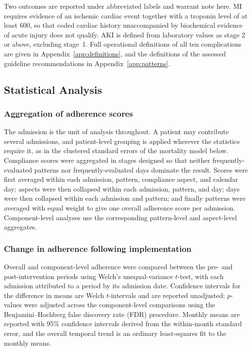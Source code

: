 Two outcomes are reported under abbreviated labels and warrant note here.
MI requires evidence of an ischemic
cardiac event together with a troponin level of at least 600, so that coded
cardiac history unaccompanied by biochemical evidence of acute injury does
not qualify. AKI is defined from laboratory
values as stage 2 or above, excluding stage~1. Full operational definitions
of all ten complications are given in Appendix~\ref{app:definitions}, and
the definitions of the assessed guideline recommendations in
Appendix~\ref{app:patterns}.

\subsection{Statistical Analysis}

\subsubsection{Aggregation of adherence scores}

The admission is the unit of analysis throughout. A patient may contribute
several admissions, and patient-level grouping is applied wherever the
statistics require it, as in the clustered standard errors of the mortality
model below. Compliance scores were aggregated in
stages designed so that neither frequently-evaluated patterns nor
frequently-evaluated days dominate the result. Scores were first averaged
within each admission, pattern, compliance aspect, and calendar day; aspects
were then collapsed within each admission, pattern, and day; days were then
collapsed within each admission and pattern; and finally patterns were
averaged with equal weight to give one overall adherence score per
admission. Component-level analyses use the corresponding pattern-level and
aspect-level aggregates.

\subsubsection{Change in adherence following implementation}

Overall and component-level adherence were compared between the pre- and
post-intervention periods using Welch's unequal-variance $t$-test, with each
admission attributed to a period by its admission date. Confidence intervals for the difference in means are Welch
$t$-intervals and are reported unadjusted; $p$-values were adjusted across
the component-level comparisons using the Benjamini--Hochberg false
discovery rate (FDR) procedure. Monthly means are reported with 95\%
confidence intervals derived from the within-month standard error, and the
overall temporal trend is an ordinary least-squares fit to the monthly
means.

